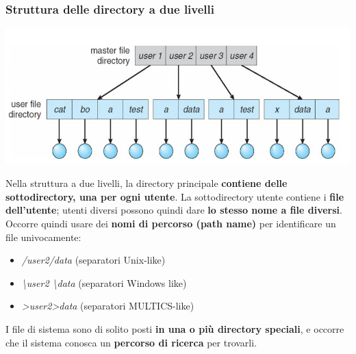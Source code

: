 \documentclass[12pt]{article}
\begin{document}
\subsubsection{Struttura delle directory a due livelli}
\begin{center}
    \includegraphics[width = 0.70\linewidth]{Images/26.png}
\end{center}
Nella struttura a due livelli, la directory principale \textbf{contiene delle sottodirectory, una per ogni utente}.
La sottodirectory utente contiene i \textbf{file dell'utente}; utenti diversi possono quindi dare \textbf{lo stesso nome a file diversi}.
Occorre quindi usare dei \textbf{nomi di percorso (path name)} per identificare un file univocamente:
\begin{itemize}
    \item \textit{/user2/data} (separatori Unix-like)
    \item \textit{\textbackslash user2 \textbackslash data} (separatori Windows like)
    \item \textit{>user2>data} (separatori MULTICS-like)
\end{itemize}
I file di sistema sono di solito posti \textbf{in una o più directory speciali}, e occorre che il sistema conosca un \textbf{percorso di ricerca} per trovarli.
\end{document}
